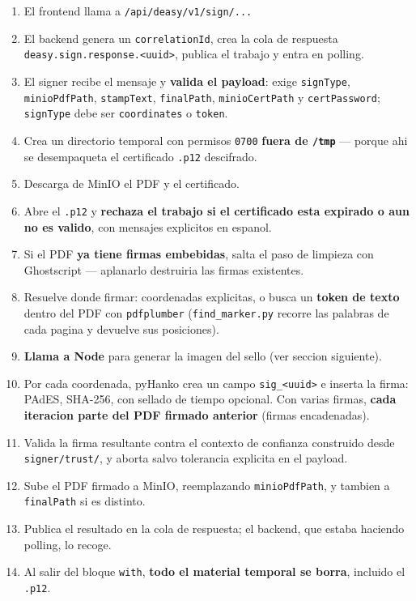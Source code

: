 \documentclass[11pt,a4paper,oneside]{report}
\newcommand{\rt}[1]{\texttt{#1}}
\begin{document}
\begin{enumerate}[leftmargin=1.8em]
  \item El frontend llama a \rt{/api/deasy/v1/sign/...}
  \item El backend genera un \rt{correlationId}, crea la cola de respuesta
        \rt{deasy.sign.response.<uuid>}, publica el trabajo y entra en polling.
  \item El signer recibe el mensaje y \textbf{valida el payload}: exige \rt{signType},
        \rt{minioPdfPath}, \rt{stampText}, \rt{finalPath}, \rt{minioCertPath} y
        \rt{certPassword}; \rt{signType} debe ser \rt{coordinates} o \rt{token}.
  \item Crea un directorio temporal con permisos \rt{0700} \textbf{fuera de \rt{/tmp}} ---
        porque ahi se desempaqueta el certificado \rt{.p12} descifrado.
  \item Descarga de MinIO el PDF y el certificado.
  \item Abre el \rt{.p12} y \textbf{rechaza el trabajo si el certificado esta expirado o aun no
        es valido}, con mensajes explicitos en espanol.
  \item Si el PDF \textbf{ya tiene firmas embebidas}, salta el paso de limpieza con Ghostscript
        --- aplanarlo destruiria las firmas existentes.
  \item Resuelve donde firmar: coordenadas explicitas, o busca un \textbf{token de texto} dentro
        del PDF con \rt{pdfplumber} (\rt{find\_marker.py} recorre las palabras de cada pagina y
        devuelve sus posiciones).
  \item \textbf{Llama a Node} para generar la imagen del sello (ver seccion siguiente).
  \item Por cada coordenada, pyHanko crea un campo \rt{sig\_<uuid>} e inserta la firma: PAdES,
        SHA-256, con sellado de tiempo opcional. Con varias firmas, \textbf{cada iteracion parte
        del PDF firmado anterior} (firmas encadenadas).
  \item Valida la firma resultante contra el contexto de confianza construido desde
        \rt{signer/trust/}, y aborta salvo tolerancia explicita en el payload.
  \item Sube el PDF firmado a MinIO, reemplazando \rt{minioPdfPath}, y tambien a \rt{finalPath}
        si es distinto.
  \item Publica el resultado en la cola de respuesta; el backend, que estaba haciendo polling,
        lo recoge.
  \item Al salir del bloque \rt{with}, \textbf{todo el material temporal se borra}, incluido el
        \rt{.p12}.
\end{enumerate}
\end{document}
